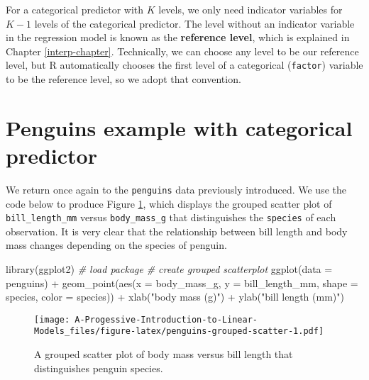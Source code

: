 \documentclass[
]{book}
\newenvironment{Shaded}{\begin{snugshade}}{\end{snugshade}}
\newcommand{\AttributeTok}[1]{\textcolor[rgb]{0.77,0.63,0.00}{#1}}
\newcommand{\CommentTok}[1]{\textcolor[rgb]{0.56,0.35,0.01}{\textit{#1}}}
\newcommand{\FunctionTok}[1]{\textcolor[rgb]{0.00,0.00,0.00}{#1}}
\newcommand{\NormalTok}[1]{#1}
\newcommand{\SpecialCharTok}[1]{\textcolor[rgb]{0.00,0.00,0.00}{#1}}
\newcommand{\StringTok}[1]{\textcolor[rgb]{0.31,0.60,0.02}{#1}}
\theoremstyle{definition}
\theoremstyle{definition}
\theoremstyle{definition}
\theoremstyle{definition}
\theoremstyle{remark}
\begin{document}
For a categorical predictor with \(K\) levels, we only need indicator variables for \(K-1\) levels of the categorical predictor. The level without an indicator variable in the regression model is known as the \textbf{reference level}, which is explained in Chapter \ref{interp-chapter}. Technically, we can choose any level to be our reference level, but R automatically chooses the first level of a categorical (\texttt{factor}) variable to be the reference level, so we adopt that convention.

\hypertarget{s:penguins-mlr2}{%
\section{Penguins example with categorical predictor}\label{s:penguins-mlr2}}

We return once again to the \texttt{penguins} data previously introduced. We use the code below to produce Figure \ref{fig:penguins-grouped-scatter}, which displays the grouped scatter plot of \texttt{bill\_length\_mm} versus \texttt{body\_mass\_g} that distinguishes the \texttt{species} of each observation. It is very clear that the relationship between bill length and body mass changes depending on the species of penguin.

\begin{Shaded}
\begin{Highlighting}[]
\FunctionTok{library}\NormalTok{(ggplot2) }\CommentTok{\# load package}
\CommentTok{\# create grouped scatterplot}
\FunctionTok{ggplot}\NormalTok{(}\AttributeTok{data =}\NormalTok{ penguins) }\SpecialCharTok{+}
  \FunctionTok{geom\_point}\NormalTok{(}\FunctionTok{aes}\NormalTok{(}\AttributeTok{x =}\NormalTok{ body\_mass\_g, }\AttributeTok{y =}\NormalTok{ bill\_length\_mm, }\AttributeTok{shape =}\NormalTok{ species, }\AttributeTok{color =}\NormalTok{ species)) }\SpecialCharTok{+}
  \FunctionTok{xlab}\NormalTok{(}\StringTok{"body mass (g)"}\NormalTok{) }\SpecialCharTok{+} \FunctionTok{ylab}\NormalTok{(}\StringTok{"bill length (mm)"}\NormalTok{)}
\end{Highlighting}
\end{Shaded}

\begin{figure}
\centering
\texttt{[image: A-Progessive-Introduction-to-Linear-Models\_files/figure-latex/penguins-grouped-scatter-1.pdf]}
\caption{\label{fig:penguins-grouped-scatter}A grouped scatter plot of body mass versus bill length that distinguishes penguin species.}
\end{figure}
\end{document}

